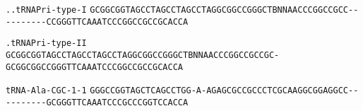 \documentclass{article}
\newcommand{\rnabox}[1]{\colorbox{#1}{\texttt{#1}}}
\begin{document}
\texttt{..tRNAPri-type-I}
\rnabox{G}\rnabox{C}\rnabox{G}\rnabox{G}\rnabox{C}\rnabox{G}\rnabox{G}\rnabox{T}\rnabox{A}\rnabox{G}\rnabox{C}\rnabox{C}\rnabox{T}\rnabox{A}\rnabox{G}\rnabox{C}\rnabox{C}\rnabox{T}\rnabox{A}\rnabox{G}\rnabox{C}\rnabox{C}\rnabox{T}\rnabox{A}\rnabox{G}\rnabox{G}\rnabox{C}\rnabox{G}\rnabox{G}\rnabox{C}\rnabox{C}\rnabox{G}\rnabox{G}\rnabox{G}\rnabox{C}\rnabox{T}\rnabox{B}\rnabox{N}\rnabox{N}\rnabox{A}\rnabox{A}\rnabox{C}\rnabox{C}\rnabox{C}\rnabox{G}\rnabox{G}\rnabox{C}\rnabox{C}\rnabox{G}\rnabox{C}\rnabox{C}\rnabox{-}\rnabox{-}\rnabox{-}\rnabox{-}\rnabox{-}\rnabox{-}\rnabox{-}\rnabox{-}\rnabox{-}\rnabox{-}\rnabox{C}\rnabox{C}\rnabox{G}\rnabox{G}\rnabox{G}\rnabox{T}\rnabox{T}\rnabox{C}\rnabox{A}\rnabox{A}\rnabox{A}\rnabox{T}\rnabox{C}\rnabox{C}\rnabox{C}\rnabox{G}\rnabox{G}\rnabox{C}\rnabox{C}\rnabox{G}\rnabox{C}\rnabox{C}\rnabox{G}\rnabox{C}\rnabox{A}\rnabox{C}\rnabox{C}\rnabox{A}

\vspace{-0.5mm}

\texttt{.tRNAPri-type-II}
\rnabox{G}\rnabox{C}\rnabox{G}\rnabox{G}\rnabox{C}\rnabox{G}\rnabox{G}\rnabox{T}\rnabox{A}\rnabox{G}\rnabox{C}\rnabox{C}\rnabox{T}\rnabox{A}\rnabox{G}\rnabox{C}\rnabox{C}\rnabox{T}\rnabox{A}\rnabox{G}\rnabox{C}\rnabox{C}\rnabox{T}\rnabox{A}\rnabox{G}\rnabox{G}\rnabox{C}\rnabox{G}\rnabox{G}\rnabox{C}\rnabox{C}\rnabox{G}\rnabox{G}\rnabox{G}\rnabox{C}\rnabox{T}\rnabox{B}\rnabox{N}\rnabox{N}\rnabox{A}\rnabox{A}\rnabox{C}\rnabox{C}\rnabox{C}\rnabox{G}\rnabox{G}\rnabox{C}\rnabox{C}\rnabox{G}\rnabox{C}\rnabox{C}\rnabox{G}\rnabox{C}\rnabox{-}\rnabox{G}\rnabox{C}\rnabox{G}\rnabox{G}\rnabox{C}\rnabox{G}\rnabox{G}\rnabox{C}\rnabox{C}\rnabox{G}\rnabox{G}\rnabox{G}\rnabox{T}\rnabox{T}\rnabox{C}\rnabox{A}\rnabox{A}\rnabox{A}\rnabox{T}\rnabox{C}\rnabox{C}\rnabox{C}\rnabox{G}\rnabox{G}\rnabox{C}\rnabox{C}\rnabox{G}\rnabox{C}\rnabox{C}\rnabox{G}\rnabox{C}\rnabox{A}\rnabox{C}\rnabox{C}\rnabox{A}

\vspace{-0.5mm}

\texttt{tRNA-Ala-CGC-1-1}
\rnabox{G}\rnabox{G}\rnabox{G}\rnabox{C}\rnabox{C}\rnabox{G}\rnabox{G}\rnabox{T}\rnabox{A}\rnabox{G}\rnabox{C}\rnabox{T}\rnabox{C}\rnabox{A}\rnabox{G}\rnabox{C}\rnabox{C}\rnabox{T}\rnabox{G}\rnabox{G}\rnabox{-}\rnabox{A}\rnabox{-}\rnabox{A}\rnabox{G}\rnabox{A}\rnabox{G}\rnabox{C}\rnabox{G}\rnabox{C}\rnabox{C}\rnabox{G}\rnabox{C}\rnabox{C}\rnabox{C}\rnabox{T}\rnabox{C}\rnabox{G}\rnabox{C}\rnabox{A}\rnabox{A}\rnabox{G}\rnabox{G}\rnabox{C}\rnabox{G}\rnabox{G}\rnabox{A}\rnabox{G}\rnabox{G}\rnabox{C}\rnabox{C}\rnabox{-}\rnabox{-}\rnabox{-}\rnabox{-}\rnabox{-}\rnabox{-}\rnabox{-}\rnabox{-}\rnabox{-}\rnabox{-}\rnabox{G}\rnabox{C}\rnabox{G}\rnabox{G}\rnabox{G}\rnabox{T}\rnabox{T}\rnabox{C}\rnabox{A}\rnabox{A}\rnabox{A}\rnabox{T}\rnabox{C}\rnabox{C}\rnabox{C}\rnabox{G}\rnabox{C}\rnabox{C}\rnabox{C}\rnabox{G}\rnabox{G}\rnabox{T}\rnabox{C}\rnabox{C}\rnabox{A}\rnabox{C}\rnabox{C}\rnabox{A}
\end{document}
